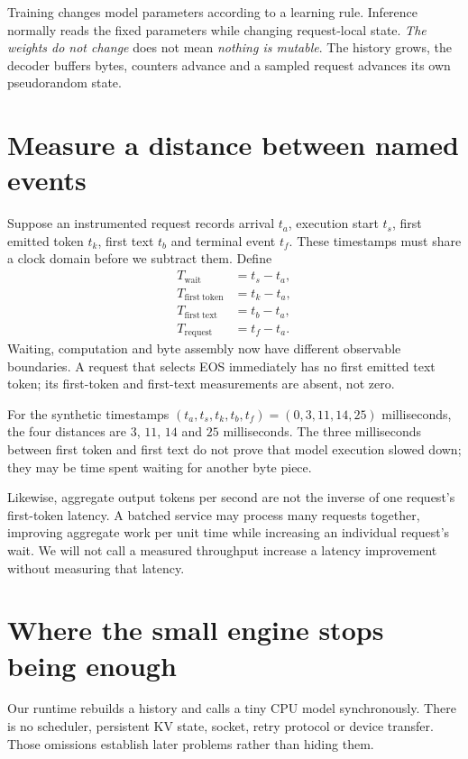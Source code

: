 Training changes model parameters according to a learning rule. Inference
normally reads the fixed parameters while changing request-local state.
\emph{The weights do not change} does not mean \emph{nothing is mutable}. The
history grows, the decoder buffers bytes, counters advance and a sampled
request advances its own pseudorandom state.

\section{Measure a distance between named events}
Suppose an instrumented request records arrival $t_a$, execution start $t_s$,
first emitted token $t_k$, first text $t_b$ and terminal event $t_f$. These
timestamps must share a clock domain before we subtract them. Define
\begin{align}
T_{\mathrm{wait}}&=t_s-t_a,\\
T_{\mathrm{first\ token}}&=t_k-t_a,\\
T_{\mathrm{first\ text}}&=t_b-t_a,\\
T_{\mathrm{request}}&=t_f-t_a.
\end{align}
Waiting, computation and byte assembly now have different observable
boundaries. A request that selects EOS immediately has no first emitted text
token; its first-token and first-text measurements are absent, not zero.


For the synthetic timestamps $(t_a,t_s,t_k,t_b,t_f)=(0,3,11,14,25)$ milliseconds,
the four distances are $3$, $11$, $14$ and $25$ milliseconds. The three
milliseconds between first token and first text do not prove that model
execution slowed down; they may be time spent waiting for another byte piece.

Likewise, aggregate output tokens per second are not the inverse of one
request's first-token latency. A batched service may process many requests
together, improving aggregate work per unit time while increasing an
individual request's wait. We will not call a measured throughput increase a
latency improvement without measuring that latency.

\section{Where the small engine stops being enough}
Our runtime rebuilds a history and calls a tiny CPU model synchronously.
There is no scheduler, persistent KV state, socket, retry protocol or device
transfer. Those omissions establish later problems rather than hiding them.

